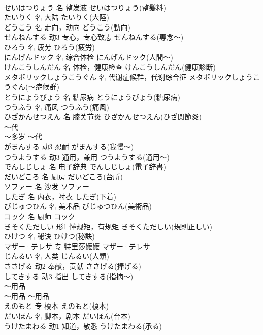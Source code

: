 \documentclass[8pt]{extreport}
\begin{document}
\begin{CJK}{UTF8}{min}
\\	せいはつりょう	名	整发液	せいはつりょう(整髪料)	
\\	たいりく	名	大陆	たいりく(大陸)	
\\	どうこう	名	走向，动向	どうこう(動向)	
\\	せんねんする	动3	专心，专心致志	せんねんする(専念～)	
\\	ひろう	名	疲劳	ひろう(疲労)	
\\	にんげんドック	名	综合体检	にんげんドック(人間～)	
\\	けんこうしんだん	名	体检，健康检查	けんこうしんだん(健康診断)	
\\	メタボリックしょうこうぐん	名	代谢症候群，代谢综合征	メタボリックしょうこうぐん(～症候群)	
\\	とうにょうびょう	名	糖尿病	とうにょうびょう(糖尿病)	
\\	つうふう	名	痛风	つうふう(痛風)	
\\	ひざかんせつえん	名	膝关节炎	ひざかんせつえん(ひざ関節炎)	
\\	～代	
\\	～多岁	～代	
\\	がまんする	动3	忍耐	がまんする(我慢～)	
\\	つうようする	动3	通用，兼用	つうようする(通用～)	
\\	でんしじしょ	名	电子辞典	でんしじしょ(電子辞書)	
\\	だいどころ	名	厨房	だいどころ(台所)	
\\	ソファー	名	沙发	ソファー	
\\	したぎ	名	内衣，衬衣	したぎ(下着)	
\\	びじゅつひん	名	美术品	びじゅつひん(美術品)	
\\	コック	名	厨师	コック	
\\	きそくただしい	形1	懂规矩，有规矩	きそくただしい(規則正しい)	
\\	ひけつ	名	秘诀	ひけつ(秘訣)	
\\	マザー·テレサ	专	特里莎嬷嬷	マザー·テレサ	
\\	じんるい	名	人类	じんるい(人類)	
\\	ささげる	动2	奉献，贡献	ささげる(捧げる)	
\\	してきする	动3	指出	してきする(指摘～)	
\\	～用品	
\\	～用品	～用品	
\\	えのもと	专	榎本	えのもと(榎本)	
\\	だいほん	名	脚本，剧本	だいほん(台本)	
\\	うけたまわる	动1	知道，敬悉	うけたまわる(承る)	

\end{CJK}
\end{document}
